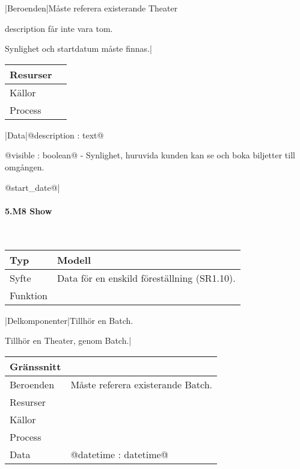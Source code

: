 \documentclass[a4paper, twoside, 11pt, titlepage]{article}
\begin{document}
			|Beroenden|Måste referera existerande Theater

			description får inte vara tom.

			Synlighet och startdatum måste finnas.|

			\begin {table} [ht] \begin{tabular} {  p{3.5cm} p{9.6cm} }
				\hline
				Resurser &   \\
				\hline
				Källor &   \\
				\hline
				Process &   \\
				\hline
			\end{tabular} \end{table} \FloatBarrier
			\vspace{6mm}

			|Data|@description : text@

			@visible : boolean@ - Synlighet, huruvida kunden kan se och boka biljetter till omgången.

			@start\_date@|

			\paragraph{5.M8 Show}\

			\begin {table} [ht] \begin{tabular} {  p{3.5cm} p{9.6cm} }
				\hline
				Typ & Modell  \\
				\hline
				Syfte & Data för en enskild föreställning (SR1.10).  \\
				\hline
				Funktion &   \\
				\hline
			\end{tabular} \end{table} \FloatBarrier
			\vspace{6mm}

			|Delkomponenter|Tillhör en Batch.

			Tillhör en Theater, genom Batch.|

			\begin {table} [ht] \begin{tabular} {  p{3.5cm} p{9.6cm} }
				\hline
				Gränssnitt &   \\
				\hline
				Beroenden & Måste referera existerande Batch.  \\
				\hline
				Resurser &   \\
				\hline
				Källor &   \\
				\hline
				Process &   \\
				\hline
				Data & @datetime : datetime@  \\
				\hline
			\end{tabular} \end{table} \FloatBarrier
\end{document}
